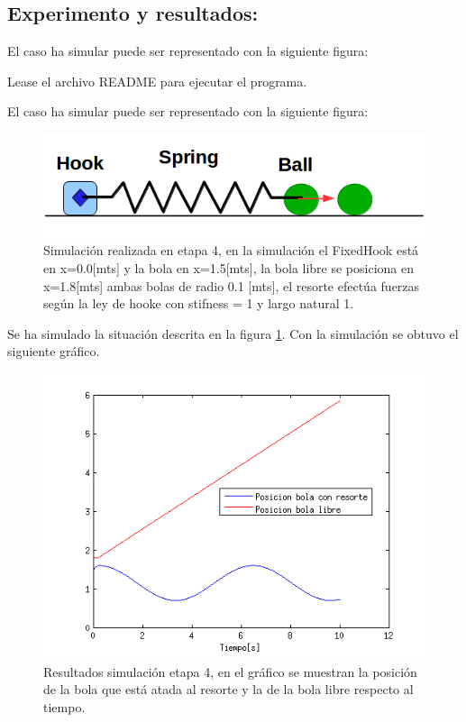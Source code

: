 \documentclass[a4paper,10pt]{article}
\begin{document}
\subsection{Experimento y resultados:}

 El caso ha simular puede ser representado con la siguiente figura:

Lease el archivo README para ejecutar el programa.\newline
  
 El caso ha simular puede ser representado con la siguiente figura:
  
   \begin{figure}[H]
 \centering
 \includegraphics[scale=0.3]{./Figure1.png}
 \caption{Simulación realizada en etapa 4, en la simulación el FixedHook está en x=0.0[mts] y la bola en x=1.5[mts], la bola libre
 se posiciona en x=1.8[mts]
 ambas bolas de radio 0.1 [mts], el resorte efectúa fuerzas según la ley de hooke con stifness = 1 y largo natural 1.}
  \label{etapa4.1}
\end{figure}


Se ha simulado la situación descrita en la figura \ref{etapa4.1}. Con la simulación se obtuvo el siguiente gráfico.


\begin{figure}[H]
 \centering
 \includegraphics[scale=0.5]{./simulacion_etapa4.png}
 \caption{Resultados simulación etapa 4, en el gráfico se muestran la posición de la bola que está atada al resorte y la de la bola libre respecto al tiempo.}
  \label{etapa4.2}
\end{figure}
\end{document}
